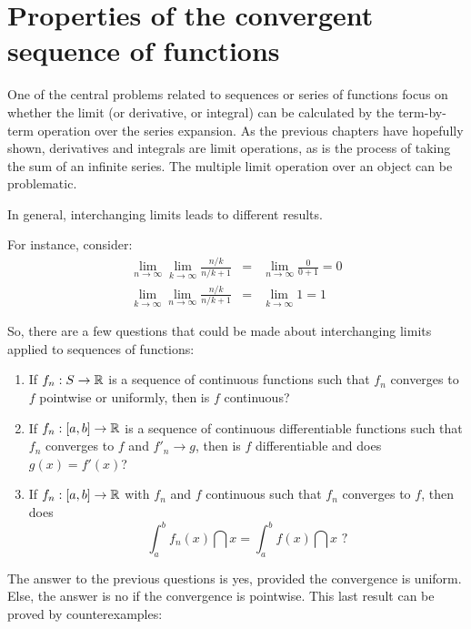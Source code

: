\section{Properties of the convergent sequence of functions}

One of the central problems related to sequences or series of functions focus on whether the limit (or derivative, or integral) can be calculated by the term-by-term operation over the series expansion. As the previous chapters have hopefully shown, derivatives and integrals are limit operations, as is the process of taking the sum of an infinite series. The multiple limit operation over an object can be problematic.

\begin{remark}
    In general, interchanging limits leads to different results.    
\end{remark}

\begin{eg}
    For instance, consider:
    \begin{eqnarray*}
        \lim \limits_{n \to \infty} \lim \limits_{k \to \infty} \frac{n/k}{n/k + 1} &=& \lim \limits_{n \to \infty} \frac{0}{0+1} = 0 \\
        \lim \limits_{k \to \infty} \lim \limits_{n \to \infty} \frac{n/k}{n/k + 1} &=& \lim \limits_{k \to \infty} 1 = 1
    \end{eqnarray*}
\end{eg}

So, there are a few questions that could be made about interchanging limits applied to sequences of functions:
\begin{enumerate}
    \item If $f_n: S \to \mathbb{R}$ is a sequence of continuous functions such that $f_n$ converges to $f$ pointwise or uniformly, then is $f$ continuous?
    \item If $f_n: [a,b] \to \mathbb{R}$ is a sequence of continuous differentiable functions such that $f_n$ converges to $f$ and $f'_n \to g$, then is $f$ differentiable and does $g(x) = f'(x)$?
    \item If $f_n: [a,b] \to \mathbb{R}$ with $f_n$ and $f$ continuous such that $f_n$ converges to $f$, then does
        \begin{equation*}
            \int_a^b f_n(x) \dint x = \int_a^b f(x) \dint x \text{ ?}
        \end{equation*}
\end{enumerate}

The answer to the previous questions is yes, provided the convergence is uniform. Else, the answer is no if the convergence is pointwise. This last result can be proved by counterexamples:

